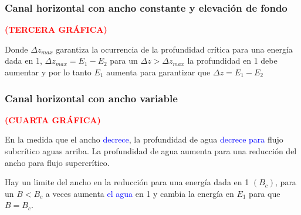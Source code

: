 \documentclass[11pt, oneside]{article}
\begin{document}
\subsubsection{Canal horizontal con ancho constante y elevación de fondo}

\textcolor{red}{\textbf{(TERCERA GRÁFICA)}} \vspace{1ex}


Donde $\Delta z_{max}$ garantiza la ocurrencia de la profundidad crítica para una energía dada en 1, $\Delta z_{max}=E_{1}-E_{2}$ para un $\Delta z>\Delta z_{max}$ la profundidad en 1 debe aumentar y por lo tanto $E_{1}$ aumenta para garantizar que $\Delta z=E_{1}-E_{2}$

\subsubsection{Canal horizontal con ancho variable}

\textcolor{red}{\textbf{(CUARTA GRÁFICA)}} \vspace{1ex}


En la medida que el ancho \textcolor{blue}{decrece}, la profundidad de agua \textcolor{blue}{decrece para}  flujo subcrítico aguas arriba. La profundidad de agua aumenta para una reducción del ancho para flujo supercrítico. \vspace{1ex}

Hay un limite del ancho en la reducción para una energía dada en 1 $(B_c)$, para un $B<B_{c}$ a veces aumenta \textcolor{blue}{el agua} en 1 y cambia la energía en $E_{1}$ para que $B=B_{c}$.
\end{document}
